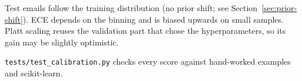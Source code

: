 \begin{assumptions}
Test emails follow the training distribution (no prior shift; see Section~\ref{sec:prior-shift}). ECE
depends on the binning and is biased upwards on small samples. Platt scaling reuses the validation part that
chose the hyperparameters, so its gain may be slightly optimistic.
\end{assumptions}
\texttt{tests/test\_calibration.py} checks every score against hand-worked examples and scikit-learn.
